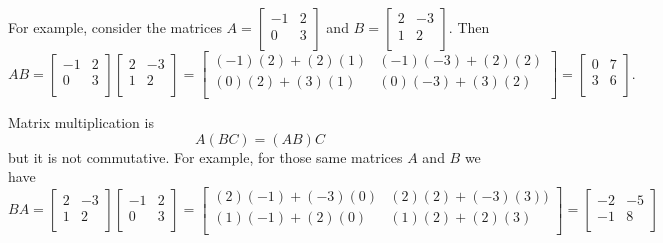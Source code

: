 \begin{defn}
\begin{apart}
           For example, consider the matrices $A=\left[ \begin{array}{rr} -1 & 2 \\ 0 & 3 \\ \end{array} \right]$ and $B=\left[ \begin{array}{rr} 2 & -3 \\ 1 & 2 \\ \end{array} \right]$.  Then
           $$AB=\left[ \begin{array}{rr} -1 & 2 \\ 0 & 3 \\ \end{array} \right]\left[ \begin{array}{rr} 2 & -3 \\ 1 & 2 \\ \end{array} \right]
           =\left[ \begin{array}{cc} (-1)(2)+(2)(1) & (-1)(-3)+(2)(2)\\ (0)(2)+(3)(1) & (0)(-3)+(3)(2) \\ \end{array} \right]
           = \left[ \begin{array}{rr} 0 & 7 \\ 3 & 6 \\ \end{array} \right]
           .$$

        \item Matrix multiplication is  $$A(BC)=(AB)C$$
        but it is not commutative.  For example, for those same matrices $A$ and $B$ we have
            $$BA = \left[ \begin{array}{rr} 2 & -3 \\ 1 & 2 \\ \end{array} \right]\left[ \begin{array}{rr} -1 & 2 \\ 0 & 3 \\ \end{array} \right]
            =\left[ \begin{array}{cc} (2)(-1)+(-3)(0) & (2)(2)+(-3)(3))\\ (1)(-1)+(2)(0) & (1)(2)+(2)(3) \\ \end{array} \right]
            = \left[ \begin{array}{rr} -2 & -5 \\ -1 & 8 \\ \end{array} \right]$$


\end{apart}
\end{defn}
